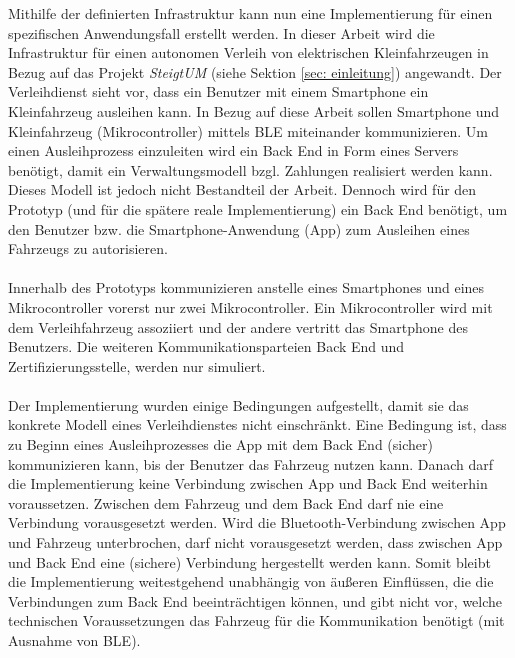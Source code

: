 Mithilfe der definierten Infrastruktur kann nun eine Implementierung für einen spezifischen Anwendungsfall erstellt werden. In dieser Arbeit wird die Infrastruktur für einen autonomen Verleih von elektrischen Kleinfahrzeugen in Bezug auf das Projekt \textit{SteigtUM} (siehe Sektion \ref{sec: einleitung}) angewandt. Der Verleihdienst sieht vor, dass ein Benutzer mit einem Smartphone ein Kleinfahrzeug ausleihen kann. In Bezug auf diese Arbeit sollen Smartphone und Kleinfahrzeug (Mikrocontroller) mittels BLE miteinander kommunizieren. Um einen Ausleihprozess einzuleiten wird ein Back End in Form eines Servers benötigt, damit ein Verwaltungsmodell bzgl. Zahlungen realisiert werden kann. Dieses Modell ist jedoch nicht Bestandteil der Arbeit. Dennoch wird für den Prototyp (und für die spätere reale Implementierung) ein Back End benötigt, um den Benutzer bzw. die Smartphone-Anwendung (App) zum Ausleihen eines Fahrzeugs zu autorisieren.
\\\\
Innerhalb des Prototyps kommunizieren anstelle eines Smartphones und eines Mikrocontroller vorerst nur zwei Mikrocontroller. Ein Mikrocontroller wird mit dem Verleihfahrzeug assoziiert und der andere vertritt das Smartphone des Benutzers. Die weiteren Kommunikationsparteien Back End und Zertifizierungsstelle, werden nur simuliert.
\\\\
Der Implementierung wurden einige Bedingungen aufgestellt, damit sie das konkrete Modell eines Verleihdienstes nicht einschränkt. Eine Bedingung ist, dass zu Beginn eines Ausleihprozesses die App mit dem Back End (sicher) kommunizieren kann, bis der Benutzer das Fahrzeug nutzen kann. Danach darf die Implementierung keine Verbindung zwischen App und Back End weiterhin voraussetzen. Zwischen dem Fahrzeug und dem Back End darf nie eine Verbindung vorausgesetzt werden. Wird die Bluetooth-Verbindung zwischen App und Fahrzeug unterbrochen, darf nicht vorausgesetzt werden, dass zwischen App und Back End eine (sichere) Verbindung hergestellt werden kann. Somit bleibt die Implementierung weitestgehend unabhängig von äußeren Einflüssen, die die Verbindungen zum Back End beeinträchtigen können, und gibt nicht vor, welche technischen Voraussetzungen das Fahrzeug für die Kommunikation benötigt (mit Ausnahme von BLE).